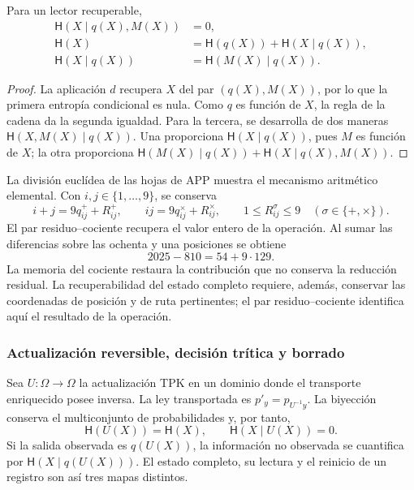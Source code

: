\begin{proposition}
Para un lector recuperable,
\begin{align}
 \mathsf H(X\mid q(X),M(X))&=0,\\
 \mathsf H(X)&=\mathsf H(q(X))+\mathsf H(X\mid q(X)),\\
 \mathsf H(X\mid q(X))&=\mathsf H(M(X)\mid q(X)).
 \label{eq:ii-kb-aut-fibra}
\end{align}
\end{proposition}
\begin{proof}
La aplicación \(d\) recupera \(X\) del par \((q(X),M(X))\),
por lo que la primera entropía condicional es nula. Como \(q\) es
función de \(X\), la regla de la cadena da la segunda igualdad.
Para la tercera, se desarrolla de dos maneras
\(\mathsf H(X,M(X)\mid q(X))\). Una proporciona
\(\mathsf H(X\mid q(X))\), pues \(M\) es función de \(X\);
la otra proporciona
\(\mathsf H(M(X)\mid q(X))+\mathsf H(X\mid q(X),M(X))\).
\end{proof}

La división euclídea de las hojas de APP muestra el mecanismo
aritmético elemental. Con \(i,j\in\{1,\ldots,9\}\), se conserva
\[
 i+j=9q^+_{ij}+R^+_{ij},\qquad
 ij=9q^\times_{ij}+R^\times_{ij},\qquad
 1\leq R^\sigma_{ij}\leq9\quad(\sigma\in\{+,\times\}).
\]
El par residuo--cociente recupera el valor entero de la operación.
Al sumar las diferencias sobre las ochenta y una posiciones se obtiene
\[
 2025-810=54+9\cdot129.
\]
La memoria del cociente restaura la contribución que no conserva la
reducción residual. La recuperabilidad del estado completo requiere,
además, conservar las coordenadas de posición y de ruta pertinentes;
el par residuo--cociente identifica aquí el resultado de la operación.

\subsubsection{Actualización reversible, decisión trítica y borrado}

Sea \(U:\Omega\to\Omega\) la actualización TPK en un dominio donde
el transporte enriquecido posee inversa. La ley transportada es
\(p'_y=p_{U^{-1}y}\). La biyección conserva el multiconjunto de
probabilidades y, por tanto,
\begin{equation}
 \mathsf H(U(X))=\mathsf H(X),\qquad
 \mathsf H(X\mid U(X))=0.
 \label{eq:ii-kb-aut-reversible}
\end{equation}
Si la salida observada es \(q(U(X))\), la información no observada
se cuantifica por \(\mathsf H(X\mid q(U(X)))\). El estado completo,
su lectura y el reinicio de un registro son así tres mapas distintos.

